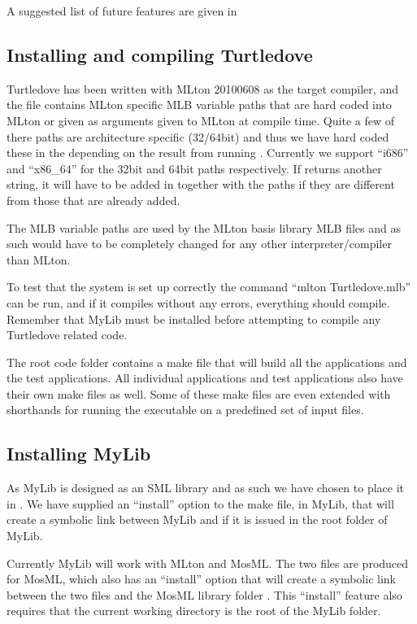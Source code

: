 A suggested list of future features are given in 


\subsection{Installing and compiling Turtledove}

Turtledove has been written with MLton 20100608 as the target compiler, and the
 file contains MLton specific MLB variable paths that
are hard coded into MLton or given as arguments given to MLton at compile
time. Quite a few of there paths are architecture specific (32/64bit) and thus
we have hard coded these in the  depending on the result from
running . Currently we support ``i686'' and ``x86_64'' for the
32bit and 64bit paths respectively. If  returns another string, it
will have to be added in  together with the paths if they are
different from those that are already added.  

The MLB variable paths are used by the MLton basis library MLB files and as such
would have to be completely changed for any other interpreter/compiler than
MLton.

To test that the system is set up correctly the command ``mlton Turtledove.mlb''
can be run, and if it compiles without any errors, everything should
compile. Remember that MyLib must be installed before attempting to compile any
Turtledove related code.

The root code folder contains a make file that will build all the applications
and the test applications. All individual applications and test applications
also have their own make files as well. Some of these make files are even
extended with shorthands for running the executable on a predefined set of input
files.

\subsection{Installing MyLib}

As MyLib is designed as an SML library and as such we have chosen to place it in
. We have supplied an ``install'' option to the
make file, in MyLib, that will create a symbolic link between MyLib and
 if it is issued in the root folder of MyLib.

Currently MyLib will work with MLton and MosML. The two  files
are produced for MosML, which also has an ``install'' option that will create a
symbolic link between the two files and the MosML library folder
. This ``install'' feature also requires that the current
working directory is the root of the MyLib folder.

